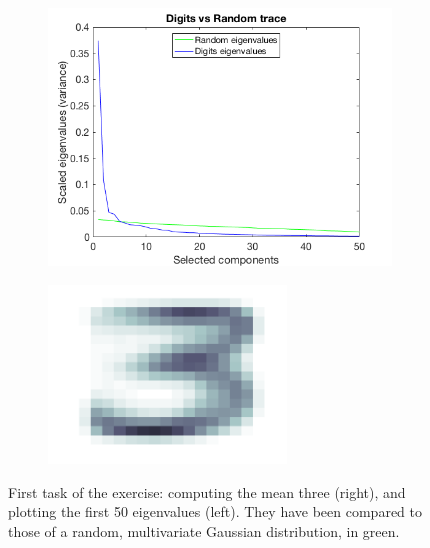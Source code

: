 \documentclass[a4paper, 10pt]{article}
\begin{document}
  \begin{figure}[h]
    \centering
    \begin{subfigure}[t]{0.4\linewidth}
      \includegraphics[width=1\linewidth]{./lab3/PCA/digits_vs_random_trace.png}
      \label{fig:trace_compared}
    \end{subfigure}
    \begin{subfigure}[t]{0.3\linewidth}
      \includegraphics[width=1\linewidth, height=4.75cm]{./lab3/PCA/mean_three.png}
      \label{fig:mean_three}
    \end{subfigure}
    \caption{First task of the exercise: computing the mean three (right), and 
    plotting the first 50 eigenvalues (left). They have been compared
  to those of a random, multivariate Gaussian distribution, in green.}
    \label{fig:first_task}
  \end{figure}
\end{document}
